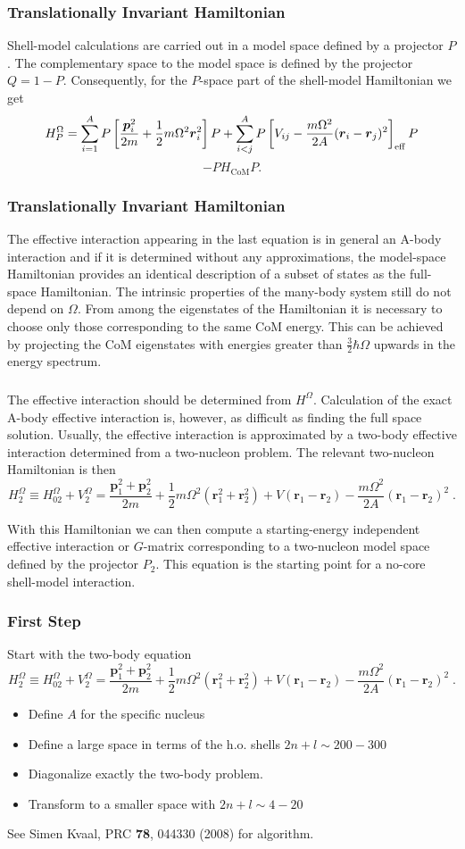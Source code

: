 \documentclass[compress]{beamer}
\renewcommand{\vec}[1]{\mathbf{#1}}
\renewcommand{\vec}[1]{\boldsymbol{#1}}
\begin{document}
 \frame
 {
 \frametitle{Translationally Invariant Hamiltonian}
 Shell-model calculations are carried out in a model space defined
 by a projector $P$. 
 The complementary space to the model space
 is defined by the projector $Q=1-P$. Consequently, for the $P$-space
 part of the shell-model Hamiltonian we get
 \[
 H^\Omega_P=\sum_{i=1}^A P\left[ \frac{\vec{p}_i^2}{2m}
 +\frac{1}{2}m\Omega^2 \vec{r}^2_i
 \right]P + \sum_{i<j}^A P\left[ V_{ij}-\frac{m\Omega^2}{2A}
 (\vec{r}_i-\vec{r}_j)^2
 \right]_{\rm eff} P 
 \]
 \[
 -PH_{\mathrm{CoM}}P.
 \]

 }


 \frame
 {
 \frametitle{Translationally Invariant Hamiltonian}
 The effective interaction appearing in the last equation is in general
 an A-body interaction and if it is determined without any approximations,
 the model-space Hamiltonian provides an identical description 
 of a subset of states as the full-space Hamiltonian.
 The intrinsic properties of the many-body system still do not depend
 on $\Omega$. From among the eigenstates of the Hamiltonian
 it is necessary to choose only those corresponding to the same 
 CoM energy. This can be achieved by projecting 
 the CoM eigenstates
 with energies greater than $\frac{3}{2}\hbar\Omega$ upwards in the
 energy spectrum. 

 }


 \frame
 {
 \frametitle{}
 The effective interaction should be determined from $H^\Omega$. 
 Calculation of the exact A-body effective
 interaction is, however, as difficult as finding the full space solution.
 Usually, the effective interaction is approximated by a 
 two-body effective interaction determined from a two-nucleon
 problem. The relevant two-nucleon Hamiltonian is then
 \[
 H^\Omega_2\equiv H^\Omega_{02}+V_2^\Omega=
 \frac{\vec{p}_1^2+\vec{p}_2^2}{2m}
 +\frac{1}{2}m\Omega^2 (\vec{r}^2_1+\vec{r}^2_2)
 + V(\vec{r}_1-\vec{r}_2)-\frac{m\Omega^2}{2A}(\vec{r}_1-\vec{r}_2)^2 \; .
 \]%

 With this Hamiltonian we can then compute a
 starting-energy independent effective interaction 
 or $G$-matrix corresponding to a two-nucleon model
 space defined by the projector $P_2$. This equation is the starting point for a 
 no-core shell-model interaction.
 }

 \frame
 {
 \frametitle{First Step}
 Start with the two-body equation 
 \[
 H^\Omega_2\equiv H^\Omega_{02}+V_2^\Omega=
 \frac{\vec{p}_1^2+\vec{p}_2^2}{2m}
 +\frac{1}{2}m\Omega^2 (\vec{r}^2_1+\vec{r}^2_2)
 + V(\vec{r}_1-\vec{r}_2)-\frac{m\Omega^2}{2A}(\vec{r}_1-\vec{r}_2)^2 \; .
 \]%
 \begin{itemize}
 \item Define $A$ for the specific nucleus
 \item Define a large space in terms of the h.o. shells $2n+l \sim 200-300$
 \item Diagonalize exactly the two-body problem.
\item Transform to a smaller space with $2n+l \sim 4-20$
 \end{itemize}
See Simen Kvaal, PRC {\bf 78}, 044330 (2008) for algorithm.
 }
\end{document}
